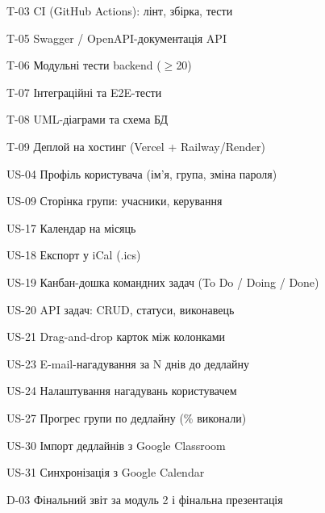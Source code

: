 \item T-03 CI (GitHub Actions): лінт, збірка, тести
\item T-05 Swagger / OpenAPI-документація API
\item T-06 Модульні тести backend ($\geq$20)
\item T-07 Інтеграційні та E2E-тести
\item T-08 UML-діаграми та схема БД
\item T-09 Деплой на хостинг (Vercel + Railway/Render)
\item US-04 Профіль користувача (ім'я, група, зміна пароля)
\item US-09 Сторінка групи: учасники, керування
\item US-17 Календар на місяць
\item US-18 Експорт у iCal (.ics)
\item US-19 Канбан-дошка командних задач (To Do / Doing / Done)
\item US-20 API задач: CRUD, статуси, виконавець
\item US-21 Drag-and-drop карток між колонками
\item US-23 E-mail-нагадування за N днів до дедлайну
\item US-24 Налаштування нагадувань користувачем
\item US-27 Прогрес групи по дедлайну (\% виконали)
\item US-30 Імпорт дедлайнів з Google Classroom
\item US-31 Синхронізація з Google Calendar
\item D-03 Фінальний звіт за модуль 2 і фінальна презентація